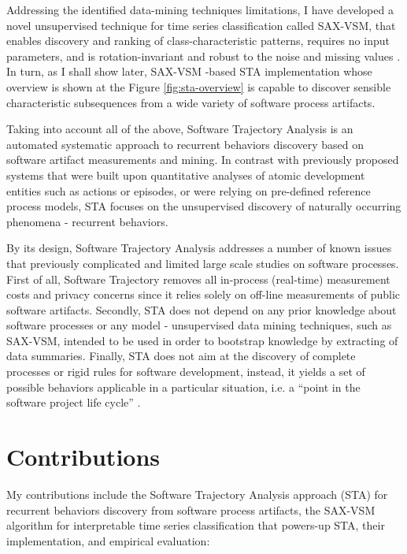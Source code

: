 Addressing the identified data-mining techniques limitations, 
I have developed a novel unsupervised technique for time series classification called SAX-VSM, that enables 
discovery and ranking of class-characteristic patterns, requires no input parameters, and is rotation-invariant 
and robust to the noise and missing values \cite{sax-vsm}. 
In turn, as I shall show later, SAX-VSM -based STA implementation whose overview is shown at the Figure \ref{fig:sta-overview} 
is capable to discover sensible characteristic subsequences from a wide variety of software process artifacts.

Taking into account all of the above, Software Trajectory Analysis is an automated systematic approach to 
recurrent behaviors discovery based on software artifact measurements and mining. 
In contrast with previously proposed systems that were built upon quantitative analyses of atomic development 
entities such as actions or episodes, or were relying on pre-defined reference process models, 
STA focuses on the unsupervised discovery of naturally occurring phenomena - recurrent behaviors. 

By its design, Software Trajectory Analysis addresses a number of known issues that previously complicated and 
limited large scale studies on software processes.
First of all, Software Trajectory removes all in-process (real-time) measurement costs and privacy concerns since 
it relies solely on off-line measurements of public software artifacts. 
Secondly, STA does not depend on any prior knowledge about software processes or any model - unsupervised 
data mining techniques, such as SAX-VSM, intended to be used in order to bootstrap knowledge by extracting of 
data summaries. 
Finally, STA does not aim at the discovery of complete processes or rigid rules for software development, instead,
it yields a set of possible behaviors applicable in a particular situation, 
i.e. a ``point in the software project life cycle'' \cite{demillo1980software}.


\section{Contributions}\label{section_contributions}
My contributions include the Software Trajectory Analysis approach (STA) for recurrent behaviors discovery
from software process artifacts, the SAX-VSM algorithm for interpretable time series classification 
that powers-up STA, their implementation, and empirical evaluation: 

